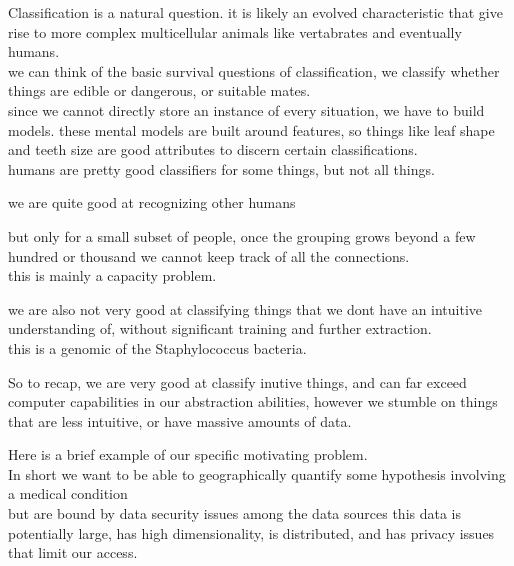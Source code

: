 \documentclass{beamer}
\begin{document}
\begin{frame}[plain]
Classification is a natural question. it is likely an evolved characteristic
that give rise to more complex multicellular animals like vertabrates and eventually
humans. \\
we can think of the basic survival questions of classification,
we classify whether things are edible or dangerous, or suitable mates.\\
since we cannot directly store an instance of every situation, we have to build
models. these mental models are built around features, so things like leaf shape
and teeth size are good attributes to discern certain classifications.\\
humans are pretty good classifiers for some things, but not all things.\\
\end{frame}

\begin{frame}[plain]
we are quite good at recognizing other humans
\end{frame}

\begin{frame}[plain]
but only for a small subset of people, once the grouping grows beyond a few
hundred or thousand we cannot keep track of all the connections. \\
this is mainly a capacity problem.
\end{frame}

\begin{frame}[plain]
we are also not very good at classifying things that we dont have an intuitive
understanding of, without significant training and further extraction. \\
this is a genomic of the Staphylococcus bacteria.
\end{frame}

\begin{frame}[plain]
So to recap, we are very good at classify inutive things, and can far exceed
computer capabilities in our abstraction abilities, however we stumble on
things that are less intuitive, or have massive amounts of data.
\end{frame}

\begin{frame}[plain]
Here is a brief example of our specific motivating problem. \\
In short we want to be able to geographically quantify some hypothesis involving a
medical condition\\
but are bound by data security issues among the data sources
this data is potentially large, has high dimensionality, is distributed, and
has privacy issues that limit our access.
\end{frame}
\end{document}
